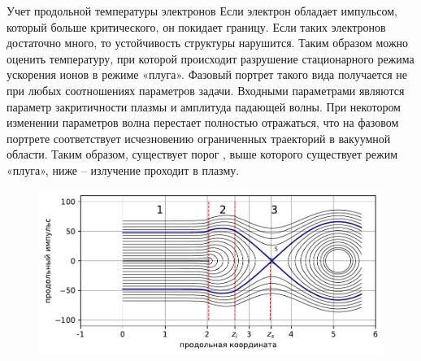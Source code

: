 \begin{frame}[t]{}
\begin{columns}[t]
\begin{column}{.48\linewidth}
\begin{block}{Учет продольной температуры электронов}
\vspace{0.6em}
                Если электрон обладает импульсом, который больше критического, он покидает границу. Если таких электронов достаточно много, то устойчивость структуры нарушится. Таким образом можно оценить температуру, при которой происходит разрушение стационарного режима ускорения ионов в режиме «плуга».
                Фазовый портрет такого вида получается не при любых соотношениях параметров задачи. Входными параметрами являются параметр закритичности плазмы и амплитуда падающей волны. При некотором изменении параметров волна перестает полностью отражаться, что на фазовом портрете соответствует исчезновению ограниченных траекторий в вакуумной области. Таким образом, существует порог , выше которого существует режим «плуга», ниже – излучение проходит в плазму.

                \begin{figure}[H]
                    \begin{minipage}{0.6\linewidth}

                            \centering
                            \includegraphics[width=\linewidth]{pic/fas_port.pdf}	
                    \end{minipage}



\end{figure}
\end{block}
\end{column}
\end{columns}
\end{frame}
